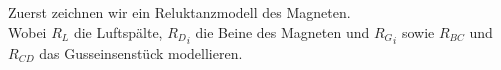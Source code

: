 \newpage
				\beginbsp
		Zuerst zeichnen wir ein Reluktanzmodell des Magneten. \\
		Wobei $R_L$ die Luftspälte, ${R_D}_i$ die Beine des Magneten und ${R_G}_i$ sowie $R_{BC}$ und $R_{CD}$ das Gusseinsenstück modellieren.
	\begin{center}
			\end{center}


